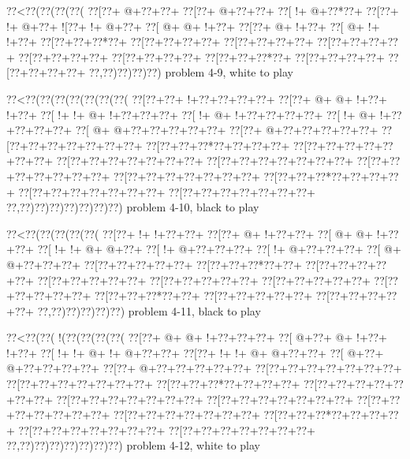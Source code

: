 \vbox{\vbox{\goo
\0??<\0??(\0??(\0??(\0??(
\0??[\0??+\- @+\0??+\0??+
\0??[\0??+\- @+\0??+\0??+
\0??[\- !+\- @+\0??*\0??+
\0??[\0??+\- !+\- @+\0??+
\- ![\0??+\- !+\- @+\0??+
\0??[\- @+\- @+\- !+\0??+
\0??[\0??+\- @+\- !+\0??+
\0??[\- @+\- !+\- !+\0??+
\0??[\0??+\0??+\0??*\0??+
\0??[\0??+\0??+\0??+\0??+
\0??[\0??+\0??+\0??+\0??+
\0??[\0??+\0??+\0??+\0??+
\0??[\0??+\0??+\0??+\0??+
\0??[\0??+\0??+\0??+\0??+
\0??[\0??+\0??+\0??*\0??+
\0??[\0??+\0??+\0??+\0??+
\0??[\0??+\0??+\0??+\0??+
\0??,\0??)\0??)\0??)\0??)
}
\hfil problem 4-9, white to play\hfil\break
}

\vbox{\vbox{\goo
\0??<\0??(\0??(\0??(\0??(\0??(\0??(\0??(
\0??[\0??+\0??+\- !+\0??+\0??+\0??+\0??+
\0??[\0??+\- @+\- @+\- !+\0??+\- !+\0??+
\0??[\- !+\- !+\- @+\- !+\0??+\0??+\0??+
\0??[\- !+\- @+\- !+\0??+\0??+\0??+\0??+
\0??[\- !+\- @+\- !+\0??+\0??+\0??+\0??+
\0??[\- @+\- @+\0??+\0??+\0??+\0??+\0??+
\0??[\0??+\- @+\0??+\0??+\0??+\0??+\0??+
\0??[\0??+\0??+\0??+\0??+\0??+\0??+\0??+
\0??[\0??+\0??+\0??*\0??+\0??+\0??+\0??+
\0??[\0??+\0??+\0??+\0??+\0??+\0??+\0??+
\0??[\0??+\0??+\0??+\0??+\0??+\0??+\0??+
\0??[\0??+\0??+\0??+\0??+\0??+\0??+\0??+
\0??[\0??+\0??+\0??+\0??+\0??+\0??+\0??+
\0??[\0??+\0??+\0??+\0??+\0??+\0??+\0??+
\0??[\0??+\0??+\0??*\0??+\0??+\0??+\0??+
\0??[\0??+\0??+\0??+\0??+\0??+\0??+\0??+
\0??[\0??+\0??+\0??+\0??+\0??+\0??+\0??+
\0??,\0??)\0??)\0??)\0??)\0??)\0??)\0??)
}
\hfil problem 4-10, black to play\hfil\break
}

\vbox{\vbox{\goo
\0??<\0??(\0??(\0??(\0??(\0??(
\0??[\0??+\- !+\- !+\0??+\0??+
\0??[\0??+\- @+\- !+\0??+\0??+
\0??[\- @+\- @+\- !+\0??+\0??+
\0??[\- !+\- !+\- @+\- @+\0??+
\0??[\- !+\- @+\0??+\0??+\0??+
\0??[\- !+\- @+\0??+\0??+\0??+
\0??[\- @+\- @+\0??+\0??+\0??+
\0??[\0??+\0??+\0??+\0??+\0??+
\0??[\0??+\0??+\0??*\0??+\0??+
\0??[\0??+\0??+\0??+\0??+\0??+
\0??[\0??+\0??+\0??+\0??+\0??+
\0??[\0??+\0??+\0??+\0??+\0??+
\0??[\0??+\0??+\0??+\0??+\0??+
\0??[\0??+\0??+\0??+\0??+\0??+
\0??[\0??+\0??+\0??*\0??+\0??+
\0??[\0??+\0??+\0??+\0??+\0??+
\0??[\0??+\0??+\0??+\0??+\0??+
\0??,\0??)\0??)\0??)\0??)\0??)
}
\hfil problem 4-11, black to play\hfil\break
}

\vbox{\vbox{\goo
\0??<\0??(\0??(\- !(\0??(\0??(\0??(\0??(
\0??[\0??+\- @+\- @+\- !+\0??+\0??+\0??+
\0??[\- @+\0??+\- @+\- !+\0??+\- !+\0??+
\0??[\- !+\- !+\- @+\- !+\- @+\0??+\0??+
\0??[\0??+\- !+\- !+\- @+\- @+\0??+\0??+
\0??[\- @+\0??+\- @+\0??+\0??+\0??+\0??+
\0??[\0??+\- @+\0??+\0??+\0??+\0??+\0??+
\0??[\0??+\0??+\0??+\0??+\0??+\0??+\0??+
\0??[\0??+\0??+\0??+\0??+\0??+\0??+\0??+
\0??[\0??+\0??+\0??*\0??+\0??+\0??+\0??+
\0??[\0??+\0??+\0??+\0??+\0??+\0??+\0??+
\0??[\0??+\0??+\0??+\0??+\0??+\0??+\0??+
\0??[\0??+\0??+\0??+\0??+\0??+\0??+\0??+
\0??[\0??+\0??+\0??+\0??+\0??+\0??+\0??+
\0??[\0??+\0??+\0??+\0??+\0??+\0??+\0??+
\0??[\0??+\0??+\0??*\0??+\0??+\0??+\0??+
\0??[\0??+\0??+\0??+\0??+\0??+\0??+\0??+
\0??[\0??+\0??+\0??+\0??+\0??+\0??+\0??+
\0??,\0??)\0??)\0??)\0??)\0??)\0??)\0??)
}
\hfil problem 4-12, white to play\hfil\break
}

